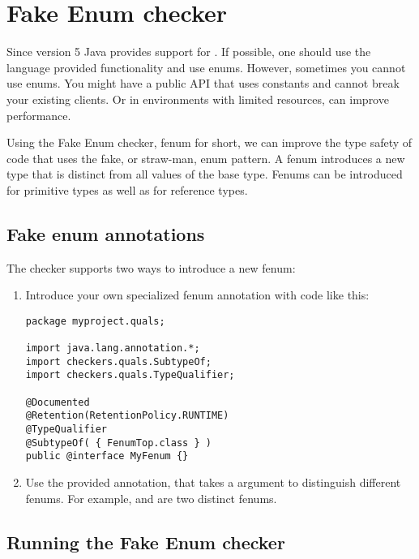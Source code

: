 \htmlhr
\chapter{Fake Enum checker\label{fenum-checker}}

Since version 5 Java provides support for 
.
If possible, one should use the language provided functionality and use enums.
However, sometimes you cannot use enums.
You might have a public API that uses  constants and cannot break your existing clients.
Or in environments with limited resources, 
can improve performance.

Using the Fake Enum checker, fenum for short, we can improve the type safety
of code that uses the fake, or straw-man, enum pattern.
A fenum introduces a new type that is distinct from all values of the base type.
Fenums can be introduced for primitive types as well as for reference types.


\section{Fake enum annotations}

The checker supports two ways to introduce a new fenum:

\begin{enumerate}
\item Introduce your own specialized fenum annotation with code like this:

\begin{Verbatim}
package myproject.quals;

import java.lang.annotation.*;
import checkers.quals.SubtypeOf;
import checkers.quals.TypeQualifier;

@Documented
@Retention(RetentionPolicy.RUNTIME)
@TypeQualifier
@SubtypeOf( { FenumTop.class } )
public @interface MyFenum {}
\end{Verbatim}

\item Use the provided  annotation, that takes a
 argument to distinguish different fenums.
For example,  and  are two distinct fenums.
\end{enumerate}


\section{Running the Fake Enum checker}

